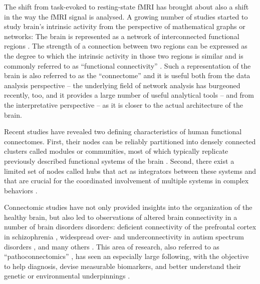 The shift from task-evoked to resting-state fMRI has brought about also a shift
in the way the fMRI signal is analysed. A growing number of studies started to
study brain's intrinsic activity from the perspective of mathematical graphs or
networks: The brain is represented as a network of interconnected functional
regions \parencite{bullmore2009}. The strength of a connection between two
regions can be expressed as the degree to which the intrinsic activity in those
two regions is similar and is commonly referred to as ``functional
connectivity'' \parencite{friston2011}. Such a representation of the brain is
also referred to as the ``connectome'' \parencite{smith2013} and it is useful
both from the data analysis perspective -- the underlying field of network
analysis has burgeoned recently, too, and it provides a large number of useful
analytical tools -- and from the interpretative perspective -- as it is closer
to the actual architecture of the brain.

Recent studies have revealed two defining characteristics of human functional
connectomes. First, their nodes can be reliably partitioned into densely
connected clusters called modules or communities, most of which typically
replicate previously described functional systems of the brain
\parencite{power2011, yeo2011}. Second, there exist a limited set of nodes
called hubs that act as integrators between these systems and that are crucial
for the coordinated involvement of multiple systems in complex behaviors
\parencite{vandenheuvel2013}.

Connectomic studies have not only provided insights into the organization of the
healthy brain, but also led to observations of altered brain connectivity in a
number of brain disorders disorders: deficient connectivity of the prefrontal
cortex in schizophrenia \parencite{anticevic2013a}, widespread over- and
underconnectivity in autism spectrum disorders \parencite{dimartino2014a}, and
many others \parencite{crossley2014,buckner2009}. This area of research, also
referred to as ``pathoconnectomics'' \parencite{rubinov2013}, has seen an
especially large following, with the objective to help diagnosis, devise
measurable biomarkers, and better understand their genetic or environmental
underpinnings \parencite{castellanos2013, khalili-mahani2017}.

